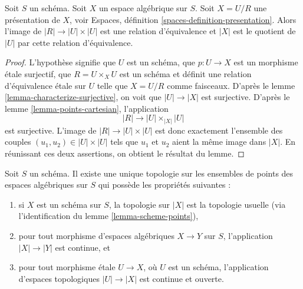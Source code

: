 \begin{lemma}
\label{lemma-points-presentation}
Soit $S$ un schéma.
Soit $X$ un espace algébrique sur $S$.
Soit $X = U/R$ une présentation de $X$, voir
Espaces, définition \ref{spaces-definition-presentation}.
Alors l'image de $|R| \to |U| \times |U|$ est une relation d'équivalence
et $|X|$ est le quotient de $|U|$ par cette relation d'équivalence.
\end{lemma}

\begin{proof}
L'hypothèse signifie que $U$ est un schéma, que $p : U \to X$ est un morphisme
étale surjectif, que $R = U \times_X U$ est un schéma et définit une relation
d'équivalence étale sur $U$ telle que $X = U/R$ comme faisceaux. D'après le
lemme \ref{lemma-characterize-surjective},
on voit que $|U| \to |X|$ est surjective. D'après le
lemme \ref{lemma-points-cartesian},
l'application
$$
|R| \longrightarrow |U| \times_{|X|} |U|
$$
est surjective. L'image de $|R| \to |U| \times |U|$ est donc
exactement l'ensemble des couples $(u_1, u_2) \in |U| \times |U|$
tels que $u_1$ et $u_2$ aient la même image dans $|X|$.
En réunissant ces deux assertions, on obtient le résultat du lemme.
\end{proof}

\begin{lemma}
\label{lemma-topology-points}
Soit $S$ un schéma. Il existe une unique topologie sur les ensembles de points
des espaces algébriques sur $S$ qui possède les propriétés suivantes :
\begin{enumerate}
\item si $X$ est un schéma sur $S$, la topologie sur $|X|$ est la topologie usuelle
(via l'identification du lemme \ref{lemma-scheme-points}),
\item pour tout morphisme d'espaces algébriques $X \to Y$ sur $S$,
l'application $|X| \to |Y|$ est continue, et
\item pour tout morphisme étale $U \to X$, où $U$ est un schéma,
l'application d'espaces topologiques $|U| \to |X|$ est continue et ouverte.
\end{enumerate}
\end{lemma}

